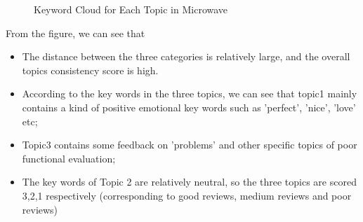 \documentclass{mcmthesis}
\begin{document}
\begin{figure}[H]
	\centering  %
	\caption{Keyword Cloud for Each Topic in Microwave }
	\label{Fig.sky2}
\end{figure}
From the figure, we can see that 
\begin{itemize}
	\item The distance between the three categories is relatively large, and the overall topics consistency score is high. 
	\item According to the key words in the three topics, we can see that topic1 mainly contains a kind of positive emotional key words such as 'perfect', 'nice', 'love' etc;
	\item Topic3 contains some feedback on 'problems' and other specific topics of poor functional evaluation; 
	\item The key words of Topic 2 are relatively neutral, so the three topics are scored 3,2,1 respectively (corresponding to good reviews, medium reviews and poor reviews)
\end{itemize}
\end{document}
